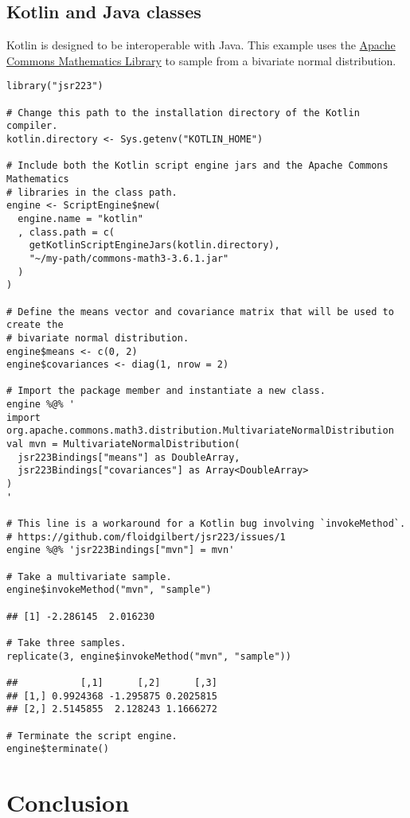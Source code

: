 \subsection{Kotlin and Java classes}

Kotlin is designed to be interoperable with Java. This example uses the \href{http://commons.apache.org/proper/commons-math/}{Apache Commons Mathematics Library} to sample from a bivariate normal distribution.

\begin{verbatim}
library("jsr223")

# Change this path to the installation directory of the Kotlin compiler.
kotlin.directory <- Sys.getenv("KOTLIN_HOME")

# Include both the Kotlin script engine jars and the Apache Commons Mathematics
# libraries in the class path.
engine <- ScriptEngine$new(
  engine.name = "kotlin"
  , class.path = c(
    getKotlinScriptEngineJars(kotlin.directory),
    "~/my-path/commons-math3-3.6.1.jar"
  )
)

# Define the means vector and covariance matrix that will be used to create the
# bivariate normal distribution.
engine$means <- c(0, 2)
engine$covariances <- diag(1, nrow = 2)

# Import the package member and instantiate a new class.
engine %@% '
import org.apache.commons.math3.distribution.MultivariateNormalDistribution
val mvn = MultivariateNormalDistribution(
  jsr223Bindings["means"] as DoubleArray,
  jsr223Bindings["covariances"] as Array<DoubleArray>
)
'

# This line is a workaround for a Kotlin bug involving `invokeMethod`.
# https://github.com/floidgilbert/jsr223/issues/1
engine %@% 'jsr223Bindings["mvn"] = mvn'

# Take a multivariate sample.
engine$invokeMethod("mvn", "sample")

## [1] -2.286145  2.016230

# Take three samples.
replicate(3, engine$invokeMethod("mvn", "sample"))

##           [,1]      [,2]      [,3]
## [1,] 0.9924368 -1.295875 0.2025815
## [2,] 2.5145855  2.128243 1.1666272

# Terminate the script engine.
engine$terminate()
\end{verbatim}

\section{Conclusion}

